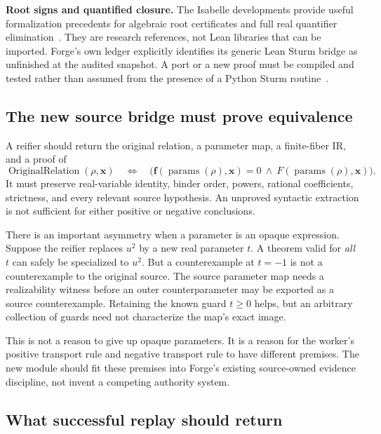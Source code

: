 \textbf{Root signs and quantified closure.} The Isabelle developments provide useful formalization precedents for algebraic root certificates and full real quantifier elimination~\cite{li-passmore-paulson,kosaian-tan-platzer}. They are research references, not Lean libraries that can be imported. Forge's own ledger explicitly identifies its generic Lean Sturm bridge as unfinished at the audited snapshot. A port or a new proof must be compiled and tested rather than assumed from the presence of a Python Sturm routine~\cite{forge}.

\subsection{The new source bridge must prove equivalence}

A reifier should return the original relation, a parameter map, a finite-fiber IR, and a proof of
\begin{equation}\label{eq:bridge}
\operatorname{OriginalRelation}(\rho,\bm x)
\quad\Longleftrightarrow\quad
\bigl(\bm f(\operatorname{params}(\rho),\bm x)=0
\ \wedge\ F(\operatorname{params}(\rho),\bm x)\bigr).
\end{equation}
It must preserve real-variable identity, binder order, powers, rational coefficients, strictness, and every relevant source hypothesis. An unproved syntactic extraction is not sufficient for either positive or negative conclusions.

There is an important asymmetry when a parameter is an opaque expression. Suppose the reifier replaces $u^2$ by a new real parameter $t$. A theorem valid for \emph{all} $t$ can safely be specialized to $u^2$. But a counterexample at $t=-1$ is not a counterexample to the original source. The source parameter map needs a realizability witness before an outer counterparameter may be exported as a source counterexample. Retaining the known guard $t\geq0$ helps, but an arbitrary collection of guards need not characterize the map's exact image.

This is not a reason to give up opaque parameters. It is a reason for the worker's positive transport rule and negative transport rule to have different premises. The new module should fit these premises into Forge's existing source-owned evidence discipline, not invent a competing authority system.

\subsection{What successful replay should return}

